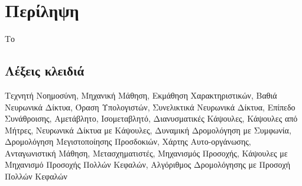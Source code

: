 \chapter*{Περίληψη}

Το 

\section*{Λέξεις κλειδιά}

\noindent
Τεχνητή Νοημοσύνη, Μηχανική Μάθηση, Εκμάθηση Χαρακτηριστικών, Βαθιά Νευρωνικά Δίκτυα, Όραση Υπολογιστών, Συνελικτικά Νευρωνικά Δίκτυα, Επίπεδο Συνάθροισης, Αμετάβλητο, Ισομεταβλητό, Διανυσματικές Κάψουλες, Κάψουλες από Μήτρες, Νευρωνικά Δίκτυα με Κάψουλες, Δυναμική Δρομολόγηση με Συμφωνία, Δρομολόγηση Μεγιστοποίησης Προσδοκιών, Χάρτης Αυτο-οργάνωσης, Ανταγωνιστική Μάθηση, Μετασχηματιστές, Μηχανισμός Προσοχής, Κάψουλες με Μηχανισμό Προσοχής Πολλών Κεφαλών, Αλγόριθμος Δρομολόγησης με Προσοχή Πολλών Κεφαλών
